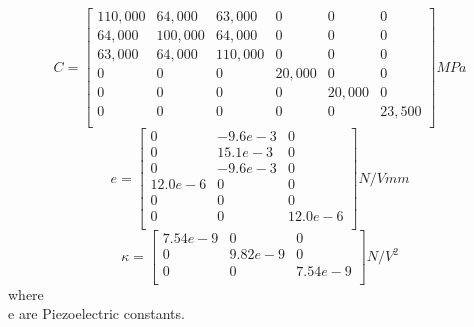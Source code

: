 \documentclass[11pt]{article}
\begin{document}
$$
C = \begin{bmatrix}
110,000 & 64,000 & 63,000 & 0 & 0 & 0\\
64,000 & 100,000 & 64,000 & 0 & 0 & 0\\
63,000 & 64,000 & 110,000 & 0 & 0 & 0\\
0 & 0 & 0 & 20,000 & 0 & 0\\
0 & 0 & 0 & 0 & 20,000 & 0\\
0 & 0 & 0 & 0 & 0 & 23,500\\
\end{bmatrix} MPa
$$  
$$
e = \begin{bmatrix}
0 & -9.6e-3 & 0 \\
0 & 15.1e-3 & 0 \\
0 & -9.6e-3 & 0\\
12.0e-6 & 0 & 0 \\
0 & 0 & 0 \\
0 & 0 & 12.0e-6 \\
\end{bmatrix} N/V mm
$$
$$
\kappa = \begin{bmatrix}
7.54e-9 & 0 & 0 \\
0 & 9.82e-9 & 0 \\
0 & 0 & 7.54e-9\\
\end{bmatrix} N/ V^{2}
$$
where \\
e are Piezoelectric constants.

\newpage
\end{document}
